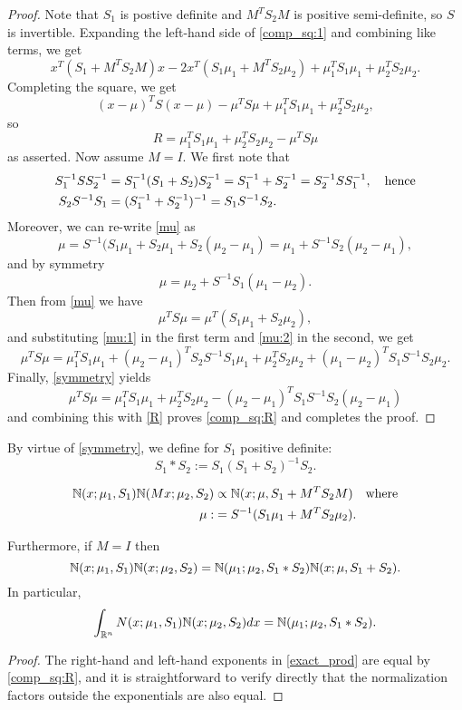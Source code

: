 \documentclass[12pt,leqno]{article}
\begin{document}
\begin{proof}
  Note that $S_1$ is postive definite and $M^TS_2M$ is positive semi-definite,
so $S$ is invertible.  Expanding the left-hand side of \eqref{comp_sq:1} and combining
like terms, we get
$$
x^T(S_1+ M^TS_2M)x -2x^T(S_1\mu_1+ M^TS_2\mu_2) 
+ \mu_1^TS_1\mu_1 + \mu_2^TS_2\mu_2.
$$
Completing the square, we get
$$
(x-\mu)^TS(x-\mu) -\mu^TS\mu + \mu_1^TS_1\mu_1 + \mu_2^TS_2\mu_2,
$$
so 
\begin{equation}\label{R}
R = \mu_1^TS_1\mu_1 + \mu_2^TS_2\mu_2-\mu^TS\mu 
\end{equation}
as asserted. Now assume $M = I$. We first note that
\begin{align}
S_1^{-1}SS_2^{-1} &= S_1^{-1}(S_1+S_2)S_2^{-1} = S_1^{-1}+S_2^{-1} = S_2^{-1}SS_1^{-1},\quad\text{hence}\notag\\
S_2S^{-1}S_1 &= (S_1^{-1}+S_2^{-1})^{-1} = S_1S^{-1}S_2.\label{symmetry}
\end{align}
Moreover, we can re-write \eqref{mu} as
\begin{equation}\label{mu:1}
\mu = S^{-1}(S_1\mu_1 + S_2\mu_1 + S_2(\mu_2-\mu_1) = \mu_1 + S^{-1}S_2(\mu_2-\mu_1),
\end{equation}
and by symmetry
\begin{equation}\label{mu:2}
\mu = \mu_2 + S^{-1}S_1(\mu_1-\mu_2).
\end{equation}
Then from \eqref{mu} we have
$$
\mu^TS\mu = \mu^T(S_1\mu_1 + S_2\mu_2),
$$
and substituting \eqref{mu:1} in the first term and \eqref{mu:2} in the second, we get
$$
\mu^TS\mu = \mu_1^TS_1\mu_1 + (\mu_2-\mu_1)^TS_2S^{-1}S_1\mu_1 + \mu_2^TS_2\mu_2 + (\mu_1-\mu_2)^TS_1S^{-1}S_2\mu_2.
$$
Finally, \eqref{symmetry} yields
$$
\mu^TS\mu = \mu_1^TS_1\mu_1 + \mu_2^TS_2\mu_2 - (\mu_2-\mu_1)^TS_1S^{-1}S_2(\mu_2-\mu_1)
$$
and combining this with \eqref{R} proves \eqref{comp_sq:R} and completes the proof.
\end{proof}

By virtue of \eqref{symmetry}, we define for $S_1$ positive definite:
$$
S_1*S_2 := S_1(S_1+S_2)^{-1}S_2.
$$

\begin{Cor}\label{comp_sq:2}
\begin{align*}
  {\mathbb N}(x;\mu_1,S_1){\mathbb N}(Mx;\mu_2,S_2) &\propto {\mathbb N}(x;\mu,S_1 + M^TS_2M)\quad\text{where}\\
 \mu :&= S^{-1}(S_1\mu_1 + M^TS_2\mu_2). 
\end{align*}

Furthermore, if $M = I$ then 
\begin{equation}\label{exact_prod} 
  {\mathbb N}(x;\mu_1,S_1){\mathbb N}(x;\mu_2,S_2) = {\mathbb N}(\mu_1;\mu_2,S_1*S_2){\mathbb N}(x;\mu,S_1+S_2).
\end{equation}
In particular,
\begin{equation}
  \int_{{\mathbb R}^n}N(x;\mu_1,S_1){\mathbb N}(x;\mu_2,S_2)dx = {\mathbb N}(\mu_1;\mu_2,S_1*S_2).
  \end{equation}
\begin{proof}
  The right-hand and left-hand exponents in \eqref{exact_prod} are equal by \eqref{comp_sq:R}, and it is
  straightforward to verify directly that the normalization factors outside the exponentials are also equal. 
\end{proof}
\end{Cor}
\end{document}
